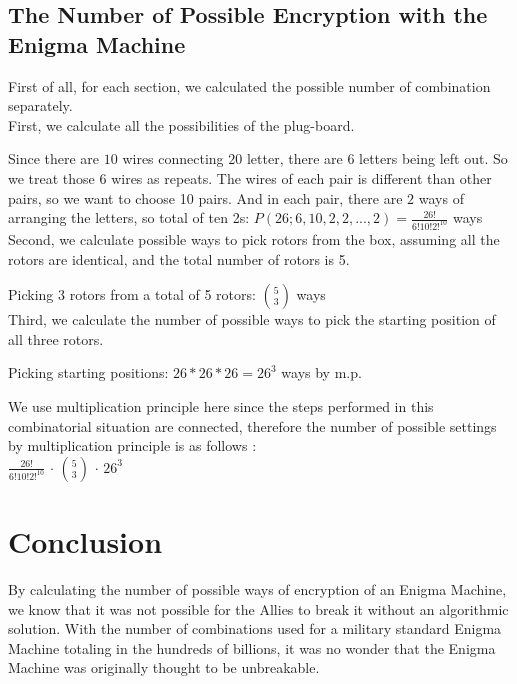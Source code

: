 \documentclass{article}
\begin{document}
\subsection{The Number of Possible Encryption with the Enigma Machine}
First of all, for each section, we calculated the possible number of combination separately. \\
First, we calculate all the possibilities of the plug-board.
\par Since there are $10$ wires connecting $20$ letter, there are 6 letters being left out. So we treat those 6 wires as repeats. The wires of each pair is different than other pairs, so we want to choose 10 pairs. And in each pair, there are $2$ ways of arranging the letters, so total of ten 2s: $P(26; 6, 10, 2, 2, ... , 2) = \frac{26!}{6!10!2!^{10}}$ ways \\
Second, we calculate possible ways to pick rotors from the box, assuming all the rotors are identical, and the total number of rotors is 5.
\par Picking 3 rotors from a total of 5 rotors: ${5}\choose{3}$ ways \\
Third, we calculate the number of possible ways to pick the starting position of all three rotors. 
\par Picking starting positions: $26 * 26 * 26 = 26^{3}$ ways by m.p.
\par We use multiplication principle here since the steps performed in this combinatorial situation are connected, therefore the number of possible settings by multiplication principle is as follows \cite{cac}: \\
        $\frac{26!}{6!10!2!^{10}}$ $\cdot$ ${5}\choose{3}$ $\cdot$ $26^{3}$

\section{Conclusion}
By calculating the number of possible ways of encryption of an Enigma Machine, we know that it was not possible for the Allies to break it without an algorithmic solution. With the number of combinations used for a military standard Enigma Machine totaling in the hundreds of billions, it was no wonder that the Enigma Machine was originally thought to be unbreakable. 



\end{document}
